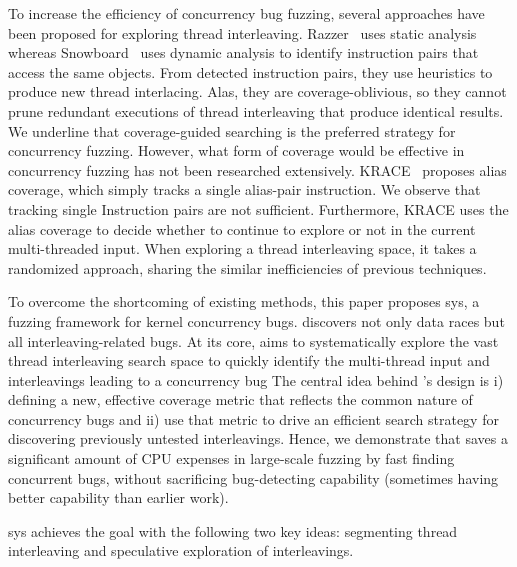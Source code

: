 To increase the efficiency of concurrency bug fuzzing, several approaches
have been proposed for exploring thread interleaving. 
Razzer~\cite{razzer} uses static analysis whereas
Snowboard~\cite{snowboard} uses dynamic analysis
to identify instruction pairs that access the same objects.
From detected instruction pairs, they use heuristics 
to produce new thread interlacing. Alas, they are coverage-oblivious, 
so they cannot prune redundant executions of thread interleaving
that produce identical results. We underline that 
coverage-guided searching is the preferred strategy 
for concurrency fuzzing. However, what form of coverage would be 
effective in concurrency fuzzing has not been researched extensively.
KRACE~\cite{krace} proposes alias coverage, which simply tracks 
a single alias-pair instruction. We observe that tracking single 
Instruction pairs are not sufficient. Furthermore, KRACE uses 
the alias coverage to decide whether to continue to explore or not 
in the current multi-threaded input. When exploring a thread 
interleaving space, it takes a randomized approach, 
sharing the similar inefficiencies of previous techniques.

To overcome the shortcoming of existing methods, this paper proposes
sys, a fuzzing framework for kernel concurrency bugs. 
\sys discovers not only data races but 
all interleaving-related bugs. 
At its core, \sys aims to systematically explore the vast thread
interleaving search space to quickly identify the multi-thread input and 
interleavings leading to a concurrency bug The central idea behind \sys's design
is i) defining a new, effective coverage metric that reflects the 
common nature of concurrency bugs and ii) use that metric to drive 
an efficient search strategy for discovering previously untested interleavings.
Hence, we demonstrate that \sys saves a significant amount of CPU expenses 
in large-scale fuzzing by fast finding concurrent bugs, 
without sacrificing bug-detecting capability (sometimes having better 
capability than earlier work).

sys achieves the goal with the following two key ideas: segmenting thread interleaving and speculative exploration of interleavings.

